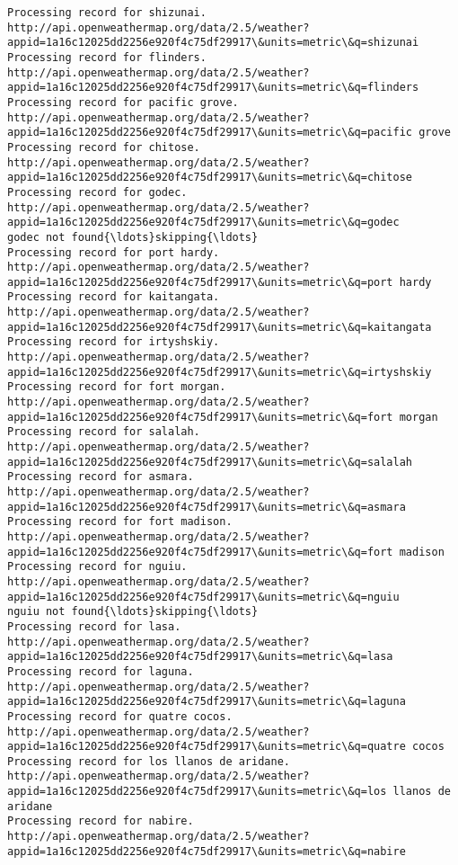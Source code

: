 \documentclass[11pt]{article}
\begin{document}
\begin{Verbatim}[commandchars=\\\{\}]
Processing record for shizunai.
http://api.openweathermap.org/data/2.5/weather?appid=1a16c12025dd2256e920f4c75df29917\&units=metric\&q=shizunai
Processing record for flinders.
http://api.openweathermap.org/data/2.5/weather?appid=1a16c12025dd2256e920f4c75df29917\&units=metric\&q=flinders
Processing record for pacific grove.
http://api.openweathermap.org/data/2.5/weather?appid=1a16c12025dd2256e920f4c75df29917\&units=metric\&q=pacific grove
Processing record for chitose.
http://api.openweathermap.org/data/2.5/weather?appid=1a16c12025dd2256e920f4c75df29917\&units=metric\&q=chitose
Processing record for godec.
http://api.openweathermap.org/data/2.5/weather?appid=1a16c12025dd2256e920f4c75df29917\&units=metric\&q=godec
godec not found{\ldots}skipping{\ldots}
Processing record for port hardy.
http://api.openweathermap.org/data/2.5/weather?appid=1a16c12025dd2256e920f4c75df29917\&units=metric\&q=port hardy
Processing record for kaitangata.
http://api.openweathermap.org/data/2.5/weather?appid=1a16c12025dd2256e920f4c75df29917\&units=metric\&q=kaitangata
Processing record for irtyshskiy.
http://api.openweathermap.org/data/2.5/weather?appid=1a16c12025dd2256e920f4c75df29917\&units=metric\&q=irtyshskiy
Processing record for fort morgan.
http://api.openweathermap.org/data/2.5/weather?appid=1a16c12025dd2256e920f4c75df29917\&units=metric\&q=fort morgan
Processing record for salalah.
http://api.openweathermap.org/data/2.5/weather?appid=1a16c12025dd2256e920f4c75df29917\&units=metric\&q=salalah
Processing record for asmara.
http://api.openweathermap.org/data/2.5/weather?appid=1a16c12025dd2256e920f4c75df29917\&units=metric\&q=asmara
Processing record for fort madison.
http://api.openweathermap.org/data/2.5/weather?appid=1a16c12025dd2256e920f4c75df29917\&units=metric\&q=fort madison
Processing record for nguiu.
http://api.openweathermap.org/data/2.5/weather?appid=1a16c12025dd2256e920f4c75df29917\&units=metric\&q=nguiu
nguiu not found{\ldots}skipping{\ldots}
Processing record for lasa.
http://api.openweathermap.org/data/2.5/weather?appid=1a16c12025dd2256e920f4c75df29917\&units=metric\&q=lasa
Processing record for laguna.
http://api.openweathermap.org/data/2.5/weather?appid=1a16c12025dd2256e920f4c75df29917\&units=metric\&q=laguna
Processing record for quatre cocos.
http://api.openweathermap.org/data/2.5/weather?appid=1a16c12025dd2256e920f4c75df29917\&units=metric\&q=quatre cocos
Processing record for los llanos de aridane.
http://api.openweathermap.org/data/2.5/weather?appid=1a16c12025dd2256e920f4c75df29917\&units=metric\&q=los llanos de aridane
Processing record for nabire.
http://api.openweathermap.org/data/2.5/weather?appid=1a16c12025dd2256e920f4c75df29917\&units=metric\&q=nabire

\end{Verbatim}
\end{document}
